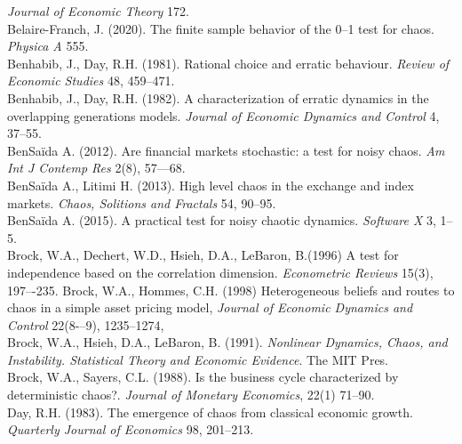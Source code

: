 \documentclass[12pt]{article}
\begin{document}
\emph{Journal of Economic Theory} 172.
\newline{}\\
\noindent Belaire-Franch, J. (2020). The finite sample behavior of the 0--1 test for chaos. \emph{Physica A}
555.
\newline{}\\
\noindent Benhabib, J., Day, R.H. (1981). Rational choice and erratic behaviour. \emph{Review of Economic
Studies} 48, 459--471.
\newline{}\\
\noindent Benhabib, J., Day, R.H. (1982). A characterization of erratic dynamics in the overlapping generations
models. \emph{Journal of Economic Dynamics and Control} 4, 37--55.
\newline{}\\
\noindent BenSa\"{i}da A. (2012). Are financial markets stochastic: a test for noisy chaos. \emph{Am Int J Contemp Res} 2(8), 57---68.
\newline{}\\
\noindent BenSa\"{i}da A., Litimi H. (2013). High level chaos in the exchange and index markets.
\emph{Chaos, Solitions and Fractals} 54, 90--95.
\newline{}\\
\noindent BenSa\"{i}da A. (2015). A practical test for noisy chaotic dynamics.
\emph{Software X} 3, 1--5.
\newline{}\\
\noindent Brock, W.A., Dechert, W.D., Hsieh, D.A., LeBaron, B.(1996) A test for independence based on the correlation dimension. \emph{Econometric Reviews} 15(3), 197–-235.
\noindent Brock, W.A., Hommes, C.H. (1998) Heterogeneous beliefs and routes to chaos in a simple asset pricing model,
\emph{Journal of Economic Dynamics and Control} 22(8-–9), 1235--1274,
\newline{}\\
\noindent Brock, W.A., Hsieh, D.A., LeBaron, B. (1991). \emph{Nonlinear Dynamics, Chaos, and Instability.
Statistical Theory and Economic Evidence}. The MIT Pres.
\newline{}\\
\noindent Brock, W.A., Sayers, C.L. (1988). Is the business cycle characterized by deterministic chaos?. \emph{Journal of Monetary Economics},
22(1) 71--90.
\newline{}\\
\noindent Day, R.H. (1983). The emergence of chaos from classical economic growth. \emph{Quarterly Journal
of Economics} 98, 201--213.
\newline{}\\
\end{document}
